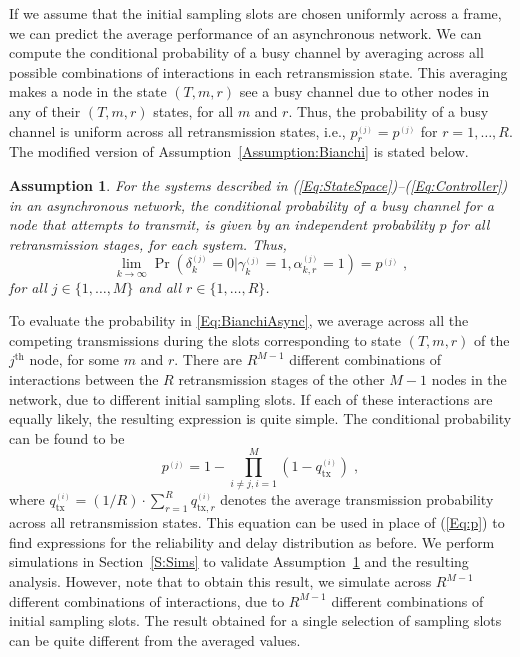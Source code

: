 \documentclass[journal]{IEEEtran}
\newtheorem{assumption}{Assumption}[section]
\begin{document}
If we assume that the initial sampling slots are chosen uniformly across a frame, we can predict the average performance of an asynchronous network. We can compute the conditional probability of a busy channel by averaging across all possible combinations of interactions in each retransmission state. This averaging makes a node in the state $(T,m,r)$ see a busy channel due to other nodes in any of their $(T,m,r)$ states, for all $m$ and $r$. Thus, the probability of a busy channel is uniform across all retransmission states, i.e., $p^{_{(j)}}_r = p^{_{(j)}}$ for $r=1,\dots,R$. The modified version of Assumption~\ref{Assumption:Bianchi} is stated below.
\begin{assumption} \label{Assumption:BianchiAsync}
For the systems described in (\ref{Eq:StateSpace})--(\ref{Eq:Controller}) in an asynchronous network, the conditional probability of a busy channel for a node that attempts to transmit, is given by an independent probability $p$ for all retransmission stages, for each system. Thus,
\begin{equation} \label{Eq:BianchiAsync}
\lim_{k \to \infty} \Pr(\delta^{_{(j)}}_k=0|\gamma^{_{(j)}}_k=1,\alpha^{_{(j)}}_{k,r}=1) = p^{_{(j)}} \; ,
\end{equation}
for all $j \in \{1,\dots,M\}$ and all $r \in \{1,\dots,R\}$.
\end{assumption}

To evaluate the probability in \eqref{Eq:BianchiAsync}, we average across all the competing transmissions during the slots corresponding to state $(T,m,r)$ of the $j^{\textrm{th}}$ node, for some $m$ and $r$. There are $R^{M-1}$ different combinations of interactions between the $R$ retransmission stages of the other $M-1$ nodes in the network, due to different initial sampling slots. If each of these interactions are equally likely, the resulting expression is quite simple. The conditional probability can be found to be
\begin{equation} \label{Eq:pAsync}
p^{_{(j)}} = 1-\prod_{i \neq j,i=1}^{M} (1-q_{\mathrm{tx}}^{_{(i)}}) \; ,
\end{equation}
where $q_{\mathrm{tx}}^{_{(i)}} = (1/R) \cdot \sum_{r=1}^R q_{\mathrm{tx},r}^{_{(i)}}$ denotes the average transmission probability across all retransmission states. This equation can be used in place of (\ref{Eq:p}) to find expressions for the reliability and delay distribution as before. We perform simulations in Section~\ref{S:Sims} to validate Assumption~\ref{Assumption:BianchiAsync} and the resulting analysis. However, note that to obtain this result, we simulate across $R^{M-1}$ different combinations of interactions, due to $R^{M-1}$ different combinations of initial sampling slots. The result obtained for a single selection of sampling slots can be quite different from the averaged values.
\end{document}
